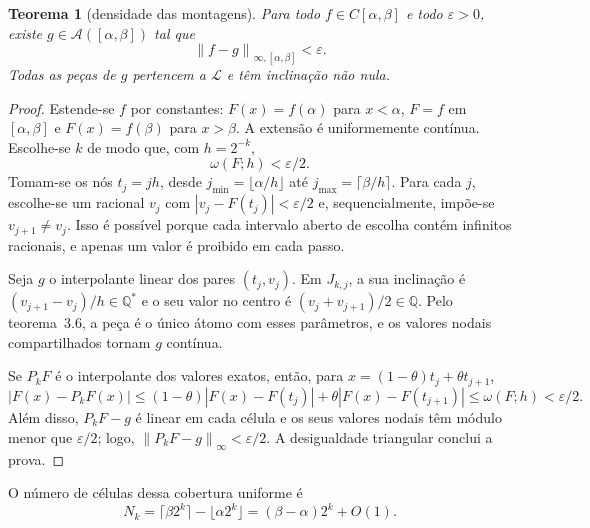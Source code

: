 \documentclass[12pt,a4paper]{article}
\theoremstyle{preciso}
\newtheorem{teorema}{Teorema}[section]
\theoremstyle{definition}
\newcommand{\Q}{\mathbb Q}
\newcommand{\LL}{\mathcal L}
\newcommand{\Asm}{\mathcal A}
\newcommand{\norm}[1]{\left\|#1\right\|_{\infty}}
\newcommand{\normK}[2]{\left\|#1\right\|_{\infty,#2}}
\newcommand{\eqn}[2]{\begin{equation}\label{eq:#1}#2\end{equation}}
\theoremstyle{preciso}
\theoremstyle{preciso}
\theoremstyle{preciso}
\theoremstyle{preciso}
\theoremstyle{definition}
\theoremstyle{preciso}
\theoremstyle{definition}
\theoremstyle{preciso}
\theoremstyle{preciso}
\theoremstyle{definition}
\begin{document}
\begin{teorema}[densidade das montagens]\label{map:artigo_1:4.2}
Para todo $f\in C[\alpha,\beta]$ e todo $\varepsilon>0$, existe $g\in\Asm([\alpha,\beta])$ tal que
\[
\normK{f-g}{[\alpha,\beta]}<\varepsilon.
\]
Todas as peças de $g$ pertencem a $\LL$ e têm inclinação não nula.
\end{teorema}
\begin{proof}
Estende-se $f$ por constantes: $F(x)=f(\alpha)$ para $x<\alpha$, $F=f$ em $[\alpha,\beta]$ e $F(x)=f(\beta)$ para $x>\beta$. A extensão é uniformemente contínua. Escolhe-se $k$ de modo que, com $h=2^{-k}$,
\eqn{22}{\omega(F;h)<\varepsilon/2.}
Tomam-se os nós $t_j=jh$, desde $j_{\min}=\lfloor\alpha/h\rfloor$ até $j_{\max}=\lceil\beta/h\rceil$. Para cada $j$, escolhe-se um racional $v_j$ com $|v_j-F(t_j)|<\varepsilon/2$ e, sequencialmente, impõe-se $v_{j+1}\ne v_j$. Isso é possível porque cada intervalo aberto de escolha contém infinitos racionais, e apenas um valor é proibido em cada passo.

Seja $g$ o interpolante linear dos pares $(t_j,v_j)$. Em $J_{k,j}$, a sua inclinação é $(v_{j+1}-v_j)/h\in\Q^*$ e o seu valor no centro é $(v_j+v_{j+1})/2\in\Q$. Pelo teorema~3.6, a peça é o único átomo com esses parâmetros, e os valores nodais compartilhados tornam $g$ contínua.

Se $P_kF$ é o interpolante dos valores exatos, então, para $x=(1-\theta)t_j+\theta t_{j+1}$,
\[
|F(x)-P_kF(x)|\le(1-\theta)|F(x)-F(t_j)|+\theta|F(x)-F(t_{j+1})|
\le\omega(F;h)<\varepsilon/2.
\]
Além disso, $P_kF-g$ é linear em cada célula e os seus valores nodais têm módulo menor que $\varepsilon/2$; logo, $\norm{P_kF-g}<\varepsilon/2$. A desigualdade triangular conclui a prova.
\end{proof}
O número de células dessa cobertura uniforme é
\eqn{23}{N_k=\lceil\beta2^k\rceil-\lfloor\alpha2^k\rfloor=(\beta-\alpha)2^k+O(1).}
\end{document}
